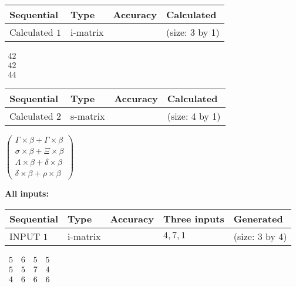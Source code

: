 \documentclass[12pt]{article}
\begin{document}
   
  
  
\noindent\begin{tabular}{|l|l|l|l|}
\hline
 Sequential & Type & Accuracy & Calculated \\ 
\hline
 
 
  Calculated $           1$ & i-matrix &  & 
 (size:           3 by           1)
 \\  \hline  
 \end{tabular}
   
   
$\begin{array}{
 c
 }
          42 \\ 
          42 \\ 
          44
 \end{array}  $ 
  
  
\noindent\begin{tabular}{|l|l|l|l|}
\hline
 Sequential & Type & Accuracy & Calculated \\ 
\hline
 
 
  Calculated $           2$ & s-matrix & & 
 (size:           4 by           1)
 \\  \hline  
 \end{tabular}
   
   
 $   \left( \begin{array}
 {
 c
 }
 \Gamma \times  \beta   +  \Gamma \times  \beta \\ 
 \sigma \times  \beta   +                     \Xi \times  \beta \\ 
 \Lambda \times  \beta   +  \delta \times  \beta \\ 
 \delta \times  \beta   +  \rho \times  \beta
 \end{array} \right) $ 
   
   
\noindent\vspace{0.1in}\hspace{-0.08in} {\textbf{\Large{All inputs: }}}
   
   
  
  
\noindent\begin{tabular}{|l|l|l|l|l|}
\hline
 Sequential & Type & Accuracy & Three inputs & Generated \\ 
\hline
 
 
  INPUT $           1$ & i-matrix &  & $
 4
 , 
 7
 , 
 1
 $ & (size:           3 by           4)
 \\  \hline  
 \end{tabular}
   
   
 $\begin{array}{
 c
 c
 c
 c
 }
           5 & 
           6 & 
           5 & 
           5 \\ 
           5 & 
           5 & 
           7 & 
           4 \\ 
           4 & 
           6 & 
           6 & 
           6
\end{array}  $ 
  
\end{document}
